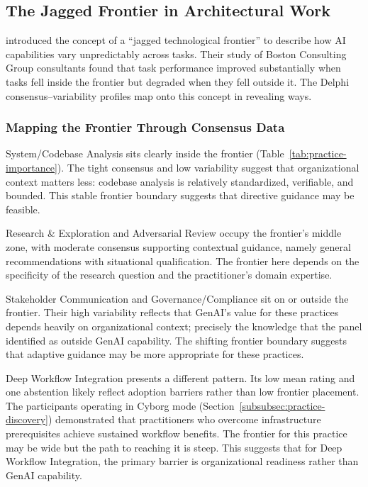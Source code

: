 \subsection{The Jagged Frontier in Architectural Work}\label{subsec:disc-jagged-frontier}

\textcite{dellacqua_navigating_2023} introduced the concept of a ``jagged
technological frontier'' to describe how AI capabilities vary unpredictably
across tasks. Their study of Boston Consulting Group consultants found that
task performance improved substantially when tasks fell inside the frontier
but degraded when they fell outside it. The Delphi consensus--variability
profiles map onto this concept in revealing ways.

\subsubsection{Mapping the Frontier Through Consensus Data}

System/Codebase Analysis sits clearly inside the frontier
(Table~\ref{tab:practice-importance}). The tight consensus and low variability
suggest that organizational context matters less: codebase analysis is
relatively standardized, verifiable, and bounded. This stable frontier boundary
suggests that directive guidance may be feasible.

Research \& Exploration and Adversarial Review occupy the frontier's middle
zone, with moderate consensus supporting contextual guidance, namely general
recommendations with situational qualification. The frontier here depends on
the specificity of the research question and the practitioner's domain
expertise.

Stakeholder Communication and Governance/Compliance sit on or outside the
frontier. Their high variability reflects that GenAI's value for these
practices depends heavily on organizational context; precisely the knowledge
that the panel identified as outside GenAI capability. The shifting frontier
boundary suggests that adaptive guidance may be more appropriate for these
practices.

Deep Workflow Integration presents a different pattern. Its low mean rating
and one abstention likely reflect adoption barriers rather than low frontier
placement. The participants operating in Cyborg mode
(Section~\ref{subsubsec:practice-discovery}) demonstrated that
practitioners who overcome infrastructure prerequisites achieve sustained
workflow benefits. The frontier for this practice may be wide but the path to reaching it is
steep. This suggests that for Deep Workflow Integration, the primary barrier
is organizational readiness rather than GenAI capability.

